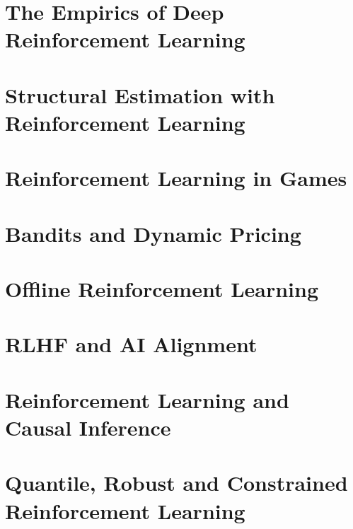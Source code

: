 

\section{The Empirics of Deep Reinforcement Learning}\label{section:deeprl_practice}


\section{Structural Estimation with Reinforcement Learning}\label{section:rl_econ_models}


\section{Reinforcement Learning in Games}\label{section:rl_games}


\section{Bandits and Dynamic Pricing}\label{section:bandits}


\section{Offline Reinforcement Learning}\label{section:offline_rl}


\section{RLHF and AI Alignment}\label{section:rlhf}


\section{Reinforcement Learning and Causal Inference}\label{section:causal_rl}


\section{Quantile, Robust and Constrained Reinforcement Learning}\label{section:dist_robust_constrained}


